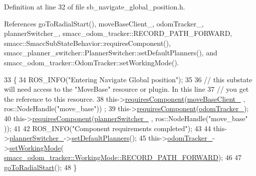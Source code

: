 Definition at line 32 of file sb\+\_\+navigate\+\_\+global\+\_\+position.\+h.



References go\+To\+Radial\+Start(), move\+Base\+Client\+\_\+, odom\+Tracker\+\_\+, planner\+Switcher\+\_\+, smacc\+\_\+odom\+\_\+tracker\+::\+R\+E\+C\+O\+R\+D\+\_\+\+P\+A\+T\+H\+\_\+\+F\+O\+R\+W\+A\+RD, smacc\+::\+Smacc\+Sub\+State\+Behavior\+::requires\+Component(), smacc\+\_\+planner\+\_\+switcher\+::\+Planner\+Switcher\+::set\+Default\+Planners(), and smacc\+\_\+odom\+\_\+tracker\+::\+Odom\+Tracker\+::set\+Working\+Mode().


\begin{DoxyCode}
33   \{
34     ROS\_INFO(\textcolor{stringliteral}{"Entering Navigate Global position"});
35 
36     \textcolor{comment}{// this substate will need access to the "MoveBase" resource or plugin. In this line}
37     \textcolor{comment}{// you get the reference to this resource.}
38     this->\hyperlink{classsmacc_1_1SmaccSubStateBehavior_a4d25c4ba8ec01c489df172a71bb1c37d}{requiresComponent}(\hyperlink{classSbNavigateGlobalPosition_ad98d35df0281643268e2b00450b00af5}{moveBaseClient\_} , ros::NodeHandle(\textcolor{stringliteral}{"move\_base"}))
      ;
39     this->\hyperlink{classsmacc_1_1SmaccSubStateBehavior_a4d25c4ba8ec01c489df172a71bb1c37d}{requiresComponent}(\hyperlink{classSbNavigateGlobalPosition_af7f17a2dabc667afa3a31c1205427ca6}{odomTracker\_});
40     this->\hyperlink{classsmacc_1_1SmaccSubStateBehavior_a4d25c4ba8ec01c489df172a71bb1c37d}{requiresComponent}(\hyperlink{classSbNavigateGlobalPosition_a27d990af827d8d99779285641110b9d1}{plannerSwitcher\_} , ros::NodeHandle(\textcolor{stringliteral}{"move\_base"}
      ));   
41 
42     ROS\_INFO(\textcolor{stringliteral}{"Component requirements completed"});
43 
44     this->\hyperlink{classSbNavigateGlobalPosition_a27d990af827d8d99779285641110b9d1}{plannerSwitcher\_}->\hyperlink{classsmacc__planner__switcher_1_1PlannerSwitcher_a9672bbbb245b3a5120b365810c9cc746}{setDefaultPlanners}();
45     this->\hyperlink{classSbNavigateGlobalPosition_af7f17a2dabc667afa3a31c1205427ca6}{odomTracker\_}->\hyperlink{classsmacc__odom__tracker_1_1OdomTracker_a38fbca999297c46dc95628cc60851a45}{setWorkingMode}(
      \hyperlink{namespacesmacc__odom__tracker_ade9730dd5cc10ccfad9362176cf46c33a989d06a586bcf9520889228da7faa643}{smacc\_odom\_tracker::WorkingMode::RECORD\_PATH\_FORWARD});
46 
47     \hyperlink{classSbNavigateGlobalPosition_a37b56e88ae4b01413c8fff19ee319769}{goToRadialStart}(); 
48   \}
\end{DoxyCode}


